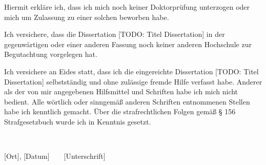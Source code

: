 \documentclass[
]{scrbook}
\begin{document}
Hiermit erkläre ich, dass ich mich noch keiner Doktorprüfung unterzogen oder mich um Zulassung zu einer solchen beworben habe.

Ich versichere, dass die Dissertation {[}TODO: Titel Dissertation{]} in der gegenwärtigen oder einer anderen Fassung noch keiner anderen Hochschule zur Begutachtung vorgelegen hat.

Ich versichere an Eides statt, dass ich die eingereichte Dissertation {[}TODO: Titel Dissertation{]} selbstständig und ohne zulässige fremde Hilfe verfasst habe. Anderer als der von mir angegebenen Hilfsmittel und Schriften habe ich mich nicht bedient. Alle wörtlich oder sinngemäß anderen Schriften entnommenen Stellen habe ich kenntlich gemacht. Über die strafrechtlichen Folgen gemäß § 156 Strafgesetzbuch wurde ich in Kenntnis gesetzt.

~

{[}Ort{]}, {[}Datum{]} ~ ~ {[}Unterschrift{]}

  
\end{document}
